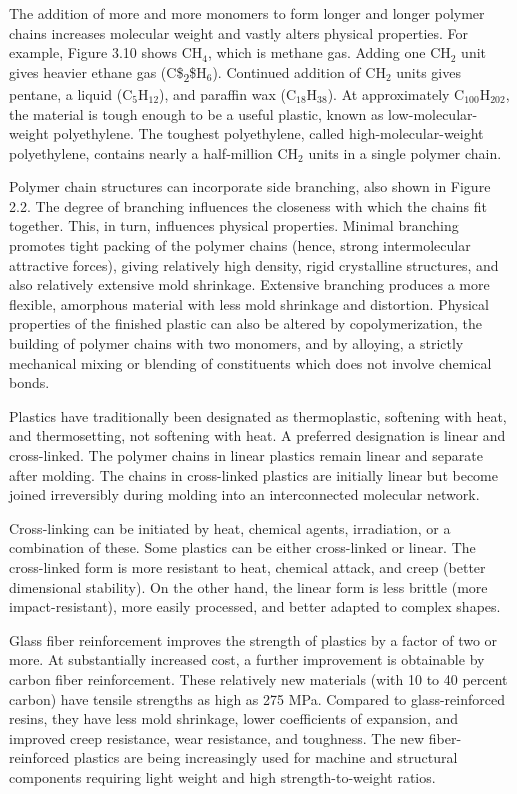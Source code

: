 \documentclass[a4paper,openany,12pt]{book}
\begin{document}
The addition of more and more monomers to form longer and longer polymer
chains increases molecular weight and vastly alters physical properties.
For example, Figure 3.10 shows \(\text{CH}_4\), which is methane gas.
Adding one \(\text{CH}_2\) unit gives heavier ethane gas (C\$\textsubscript{2}\$H\(_6\)).
Continued addition of \(\text{CH}_2\) units gives pentane, a liquid
(\(\text{C}_5\text{H}_{12}\)), and paraffin wax
(\(\text{C}_{18}\text{H}_{38}\)). At approximately
\(\text{C}_{100}\text{H}_{202}\), the material is tough enough to be a
useful plastic, known as low-molecular-weight polyethylene. The toughest
polyethylene, called high-molecular-weight polyethylene, contains nearly
a half-million \(\text{CH}_2\) units in a single polymer chain.

Polymer chain structures can incorporate side branching, also shown in
Figure 2.2. The degree of branching influences the closeness with which
the chains fit together. This, in turn, influences physical properties.
Minimal branching promotes tight packing of the polymer chains (hence,
strong intermolecular attractive forces), giving relatively high
density, rigid crystalline structures, and also relatively extensive
mold shrinkage. Extensive branching produces a more flexible, amorphous
material with less mold shrinkage and distortion. Physical properties of
the finished plastic can also be altered by copolymerization, the
building of polymer chains with two monomers, and by alloying, a
strictly mechanical mixing or blending of constituents which does not
involve chemical bonds.

Plastics have traditionally been designated as thermoplastic, softening
with heat, and thermosetting, not softening with heat. A preferred
designation is linear and cross-linked. The polymer chains in linear
plastics remain linear and separate after molding. The chains in
cross-linked plastics are initially linear but become joined
irreversibly during molding into an interconnected molecular network.

Cross-linking can be initiated by heat, chemical agents, irradiation, or
a combination of these. Some plastics can be either cross-linked or
linear. The cross-linked form is more resistant to heat, chemical
attack, and creep (better dimensional stability). On the other hand, the
linear form is less brittle (more impact-resistant), more easily
processed, and better adapted to complex shapes.

Glass fiber reinforcement improves the strength of plastics by a factor
of two or more. At substantially increased cost, a further improvement
is obtainable by carbon fiber reinforcement. These relatively new
materials (with 10 to 40 percent carbon) have tensile strengths as high
as 275 MPa. Compared to glass-reinforced resins, they have less mold
shrinkage, lower coefficients of expansion, and improved creep
resistance, wear resistance, and toughness. The new fiber-reinforced
plastics are being increasingly used for machine and structural
components requiring light weight and high strength-to-weight ratios.
\end{document}
